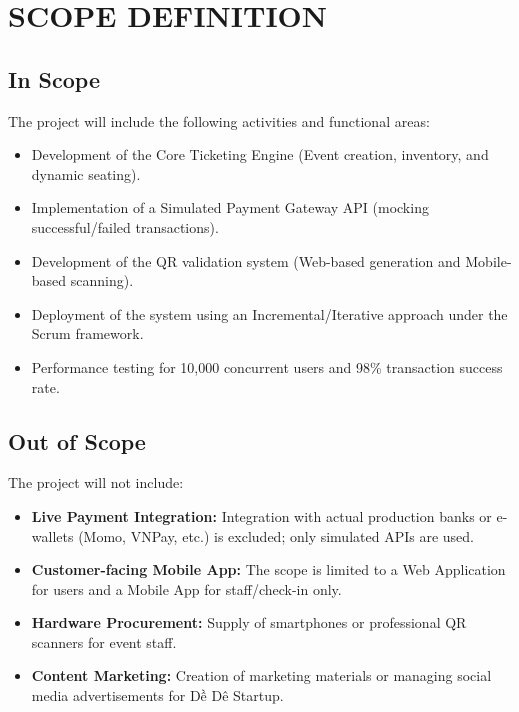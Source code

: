 \chapter{SCOPE DEFINITION}

\section{In Scope}
The project will include the following activities and functional areas:
\begin{itemize}
    \item Development of the Core Ticketing Engine (Event creation, inventory, and dynamic seating).
    \item Implementation of a Simulated Payment Gateway API (mocking successful/failed transactions).
    \item Development of the QR validation system (Web-based generation and Mobile-based scanning).
    \item Deployment of the system using an Incremental/Iterative approach under the Scrum framework.
    \item Performance testing for 10,000 concurrent users and 98\% transaction success rate.
\end{itemize}

\section{Out of Scope}
The project will not include:
\begin{itemize}
    \item \textbf{Live Payment Integration:} Integration with actual production banks or e-wallets (Momo, VNPay, etc.) is excluded; only simulated APIs are used.
    \item \textbf{Customer-facing Mobile App:} The scope is limited to a Web Application for users and a Mobile App for staff/check-in only.
    \item \textbf{Hardware Procurement:} Supply of smartphones or professional QR scanners for event staff.
    \item \textbf{Content Marketing:} Creation of marketing materials or managing social media advertisements for Dề Dê Startup.
\end{itemize}